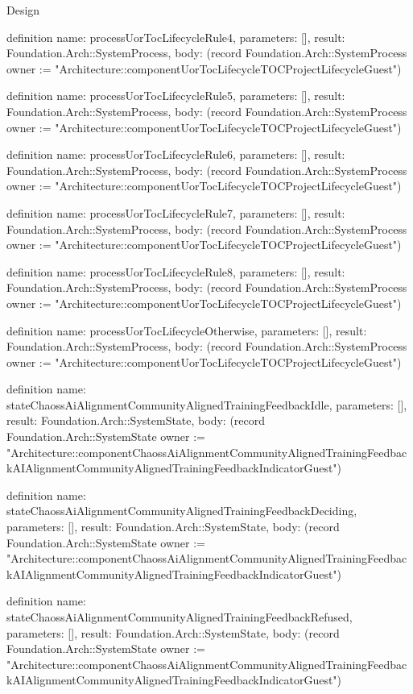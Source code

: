 \begin{lexlean}{Design}
\begin{semanticmodule}
definition{
  name: processUorTocLifecycleRule4,
  parameters: [],
  result: Foundation.Arch::SystemProcess,
  body: (record Foundation.Arch::SystemProcess {owner := "Architecture::componentUorTocLifecycleTOCProjectLifecycleGuest"})
}

definition{
  name: processUorTocLifecycleRule5,
  parameters: [],
  result: Foundation.Arch::SystemProcess,
  body: (record Foundation.Arch::SystemProcess {owner := "Architecture::componentUorTocLifecycleTOCProjectLifecycleGuest"})
}

definition{
  name: processUorTocLifecycleRule6,
  parameters: [],
  result: Foundation.Arch::SystemProcess,
  body: (record Foundation.Arch::SystemProcess {owner := "Architecture::componentUorTocLifecycleTOCProjectLifecycleGuest"})
}

definition{
  name: processUorTocLifecycleRule7,
  parameters: [],
  result: Foundation.Arch::SystemProcess,
  body: (record Foundation.Arch::SystemProcess {owner := "Architecture::componentUorTocLifecycleTOCProjectLifecycleGuest"})
}

definition{
  name: processUorTocLifecycleRule8,
  parameters: [],
  result: Foundation.Arch::SystemProcess,
  body: (record Foundation.Arch::SystemProcess {owner := "Architecture::componentUorTocLifecycleTOCProjectLifecycleGuest"})
}

definition{
  name: processUorTocLifecycleOtherwise,
  parameters: [],
  result: Foundation.Arch::SystemProcess,
  body: (record Foundation.Arch::SystemProcess {owner := "Architecture::componentUorTocLifecycleTOCProjectLifecycleGuest"})
}

definition{
  name: stateChaossAiAlignmentCommunityAlignedTrainingFeedbackIdle,
  parameters: [],
  result: Foundation.Arch::SystemState,
  body: (record Foundation.Arch::SystemState {owner := "Architecture::componentChaossAiAlignmentCommunityAlignedTrainingFeedbackAIAlignmentCommunityAlignedTrainingFeedbackIndicatorGuest"})
}

definition{
  name: stateChaossAiAlignmentCommunityAlignedTrainingFeedbackDeciding,
  parameters: [],
  result: Foundation.Arch::SystemState,
  body: (record Foundation.Arch::SystemState {owner := "Architecture::componentChaossAiAlignmentCommunityAlignedTrainingFeedbackAIAlignmentCommunityAlignedTrainingFeedbackIndicatorGuest"})
}

definition{
  name: stateChaossAiAlignmentCommunityAlignedTrainingFeedbackRefused,
  parameters: [],
  result: Foundation.Arch::SystemState,
  body: (record Foundation.Arch::SystemState {owner := "Architecture::componentChaossAiAlignmentCommunityAlignedTrainingFeedbackAIAlignmentCommunityAlignedTrainingFeedbackIndicatorGuest"})
}


\end{semanticmodule}
\end{lexlean}
